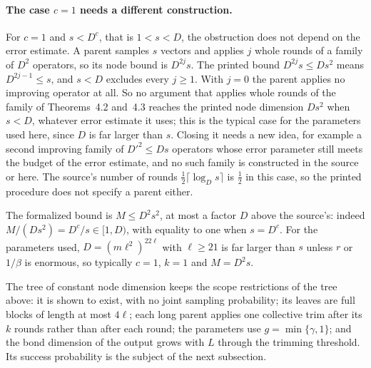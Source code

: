 \documentclass{article}
\begin{document}
\paragraph{The case $c=1$ needs a different construction.}
For $c=1$ and $s<D^c$, that is $1<s<D$, the obstruction does not depend on the error
estimate. A parent samples $s$ vectors and applies $j$ whole rounds of a
family of $D^2$ operators, so its node bound is $D^{2j}s$. The printed bound
$D^{2j}s\le Ds^2$ means $D^{2j-1}\le s$, and $s<D$ excludes every $j\ge1$.
With $j=0$ the parent applies no improving operator at all. So no argument
that applies whole rounds of the family of Theorems~4.2 and~4.3 reaches the
printed node dimension $Ds^2$ when $s<D$, whatever error estimate it uses;
this is the typical case for the parameters used here, since $D$ is far
larger than $s$. Closing it needs a new idea, for example a second improving
family of $D'^2\le Ds$ operators whose error parameter still meets the
budget of the error estimate, and no such family is constructed in the
source or here. The source's number of rounds $\tfrac12\lceil\log_Ds\rceil$
is $\tfrac12$ in this case, so the printed procedure does not specify a
parent either.

The formalized bound is
$M\le D^2s^2$, at most a factor $D$ above the source's: indeed
$M/(Ds^2)=D^c/s\in[1,D)$, with equality to one when $s=D^c$. For the parameters used, $D=(m\ell^2)^{22\ell}$ with
$\ell\ge21$ is far larger than $s$ unless $r$ or $1/\beta$ is enormous, so
typically $c=1$, $k=1$ and $M=D^2s$.

The tree of constant node dimension keeps the scope restrictions of the
tree above: it is shown to exist, with no joint sampling probability; its
leaves are full blocks of length at most $4\ell$; each long parent applies
one collective trim after its $k$ rounds rather than after each round; the
parameters use $g=\min\{\gamma,1\}$; and the bond dimension of the output
grows with $L$ through the trimming threshold. Its success probability is
the subject of the next subsection.
\end{document}
